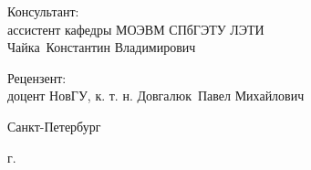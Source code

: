 \begin{titlepage}
\begin{center}
\begin{flushright}
\begin{minipage}[t]{0.67\textwidth}
\vspace{10mm}

{Консультант:} \\
ассистент кафедры МОЭВМ СПбГЭТУ ЛЭТИ \\ Чайка~Константин Владимирович

\vspace{10mm}

{Рецензент:} \\
доцент НовГУ, к. т. н. Довгалюк~Павел Михайлович
\end{minipage}
\end{flushright}

\vfill

{Санкт-Петербург}
\par{\the\year{} г.}
\end{center}
\end{titlepage}
\restoregeometry
\addtocounter{page}{1}
